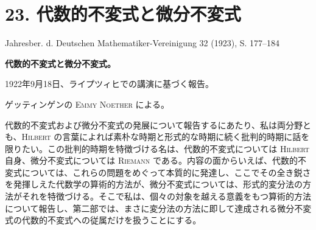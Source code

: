 \documentclass[11pt]{article}
\begin{document}
\section*{23. 代数的不変式と微分不変式}
\begin{center}
Jahresber. d. Deutschen Mathematiker-Vereinigung 32 (1923), S. 177--184
\end{center}

\begin{center}
{\Large\bfseries 代数的不変式と微分不変式。}\par
\vspace{0.45em}
1922年9月18日、ライプツィヒでの講演に基づく報告。\par
\vspace{1.0em}
ゲッティンゲンの \textsc{Emmy Noether} による。
\end{center}

\begingroup
\renewcommand{\thefootnote}{\arabic{footnote})}
\setcounter{footnote}{0}

代数的不変式および微分不変式の発展について報告するにあたり、私は両分野とも、\textsc{Hilbert} の言葉によれば素朴な時期と形式的な時期に続く批判的時期に話を限りたい。この批判的時期を特徴づける名は、代数的不変式については \textsc{Hilbert} 自身、微分不変式については \textsc{Riemann} である。内容の面からいえば、代数的不変式については、これらの問題をめぐって本質的に発達し、ここでその全き鋭さを発揮しえた代数学の算術的方法が、微分不変式については、形式的変分法の方法がそれを特徴づける。そこで私は、個々の対象を越える意義をもつ算術的方法について報告し、第二部では、まさに変分法の方法に即して達成される微分不変式の代数的不変式への従属だけを扱うことにする。
\end{document}
